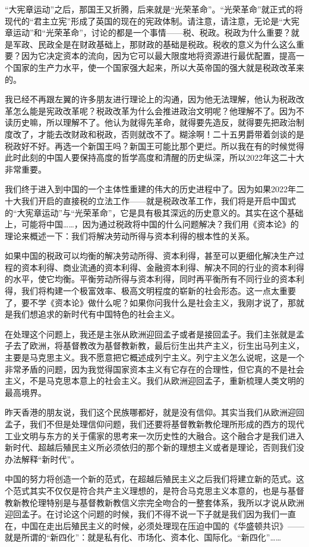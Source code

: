 \documentclass[UTF8, 12pt, a4paper]{ctexrep}
\begin{document}
“大宪章运动”之后，那国王又折腾，后来就是“光荣革命”。“光荣革命”就正式的将现代的“君主立宪”形成了英国的现在的宪政体制。请注意，请注意，无论是“大宪章运动”和“光荣革命”，讨论的都是一个事情——税、税政。税政为什么重要？就是军政、民政全是在财政基础上，那财政的基础是税政。税收的意义为什么这么重要？因为它决定资本的流向，因为它可以最大限度地将资源进行最优配置，提高一个国家的生产力水平，使一个国家强大起来，所以大英帝国的强大就是税政改革来的。

我已经不再跟左翼的许多朋友进行理论上的沟通，因为他无法理解，他认为税政改革怎么能是宪政改革呢？税政改革为什么会推进政治文明呢？他理解不了。因为不读历史嘛，所以理解不了。他认为就得先革命，就得要先造反，就得要先把政治制度改了，才能去改财政和税政，否则就改不了。糊涂啊！二十五男爵带着剑谈的是税政好不好。再选一个新国王吗？新国王可能比那个更烂。所以我在有的时候觉得此时此刻的中国人要保持高度的哲学高度和清醒的历史纵深，所以2022年这二十大非常重要。

我们终于进入到中国的一个主体性重建的伟大的历史进程中了。因为如果2022年二十大我们开启的直接税的立法工作——就是税政改革工作，我们将是开启中国式的“大宪章运动”与“光荣革命”，它是具有极其深远的历史意义的。其实在这个基础上，可能将中国……，因为通过税政将中国的什么问题解决？我们用《资本论》的理论来概述一下：我们将解决劳动所得与资本利得的根本性的关系。

如果中国的税政可以均衡的解决劳动所得、资本利得，甚至可以更细化解决生产过程的资本利得、商业流通的资本利得、金融资本利得、解决不同的行业的资本利得的水平，使它均衡。平衡劳动所得与资本利得，同时再平衡所有不同行业的资本利得，我们将构建一个极富效率、极高文明程度的崭新的社会形态。这一点太重要了，要不学《资本论》做什么呢？如果你问我什么是社会主义，我刚才说了，那就是我们想追求的新时代有中国特色的社会主义。

在处理这个问题上，我还是主张从欧洲迎回孟子或者是接回孟子。我们主张就是孟子去了欧洲，将基督教改为基督教新教，最后衍生出共产主义，衍生出马列主义，主要是马克思主义。我不愿意把它概述成列宁主义。列宁主义怎么说呢，这是一个非常矛盾的问题，因为我觉得国家资本主义有它存在的合理性，但它真的不是社会主义，不是马克思本意上的社会主义。我们从欧洲迎回孟子，重新梳理人类文明的最高境界。

昨天香港的朋友说，我们这个民族哪都好，就是没有信仰。其实当我们从欧洲迎回孟子，我们不但是处理信仰问题，我们还要将基督教新教伦理所形成的西方的现代工业文明与东方的关于儒家的思考来一次历史性的大融合。这个融合才是我们进入新时代、超越后殖民主义所必须依归的那个新的理想主义或者是理论，否则我们没办法解释“新时代”。

中国的努力将创造一个新的范式，在超越后殖民主义之后我们将建立新的范式。这个范式其实不仅仅是符合共产主义理想的，是符合马克思主义本意的，也是与基督教新教伦理特别是与基督教新教信义宗完全吻合的一整套体系，我所以才说从欧洲迎回孟子。在讨论这个问题的时候，我们不得不说一下子就是我们因为我们一直在，中国在走出后殖民主义的时候，必须处理现在压迫中国的《华盛顿共识》——就是所谓的“新四化”：就是私有化、市场化、资本化、国际化。“新四化”……
\end{document}
